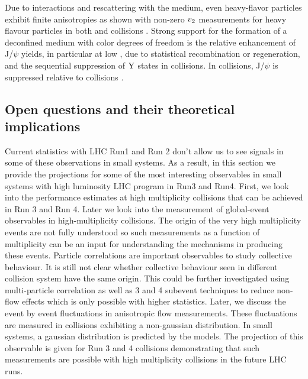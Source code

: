 \documentclass[../report.tex]{subfiles}
\begin{document}
Due to interactions and rescattering with the medium, even heavy-flavor particles exhibit finite anisotropies as shown with non-zero $v_{\rm{2}}$ measurements for heavy flavour particles in both \PbPb{} and \pPb{} collisions \cite{ALICE:2013xna,Abelev:2013lca,Abelev:2014ipa,Adam:2015pga,Acharya:2017tfn,Adam:2016ssk,ALICE:2016clc,Acharya:2017qps,Sirunyan:2017plt,Acharya:2017tgv,Khachatryan:2016ypw,Acharya:2018dxy,Sirunyan:2018toe}. Strong support for the formation of a deconfined medium with color degrees of freedom is the relative enhancement of J/$\psi$ yields, in particular at low \pt{}, due to statistical recombination or regeneration, and the sequential suppression of $\rm{Y}$ states in \PbPb{} collisions. In \pPb{} collisions, J/$\psi$ is suppressed relative to \pp{} collisions \cite{Abelev:2012rv,Adam:2015rba,Chatrchyan:2012lxa, Chatrchyan:2013nza, Abelev:2014zpa, Adam:2015jsa, Adam:2016ohd, Adam:2015rta, Adam:2015isa, Adam:2015gba, Adam:2016rdg, Adamova:2017uhu, Acharya:2017tfn, Acharya:2017hjh, Sirunyan:2017lzi, Khachatryan:2016ypw, Sirunyan:2017mzd, Sirunyan:2017isk, Khachatryan:2016xxp, Sirunyan:2016znt, Aaboud:2017cif, Aaij:2017cqq}. 


\subsection{Open questions and their theoretical implications}

Current statistics with LHC Run1 and Run 2 don't allow us to see signals in some of these observations in small systems. As a result, in this section we provide the projections for some of the most interesting observables in small systems with high luminosity LHC program in Run3 and Run4. First, we look into the performance estimates at high multiplicity \pp{} collisions that can be achieved in Run 3 and Run 4. Later we look into the measurement of global-event observables in high-multiplicity \pp{} collisions. The origin of the very high multiplicity events are not fully understood so such measurements as a function of multiplicity can be an input for understanding the mechanisms in producing these events. Particle correlations are important observables to study collective behaviour. It is still not clear whether collective behaviour seen in different collision system have the same origin. This could be further investigated using multi-particle correlation as well as 3 and 4 subevent techniques to reduce non-flow effects which is only possible with higher statistics. Later, we discuss the event by event fluctuations in anisotropic flow measurements. These fluctuations are measured in \PbPb{} collisions exhibiting a non-gaussian distribution. In small systems, a gaussian distribution is predicted by the models. The projection of this observable is given for Run 3 and 4 \pp{} collisions demonstrating that such measurements are possible with high multiplicity \pp{} collisions in the future LHC runs. 
\end{document}
